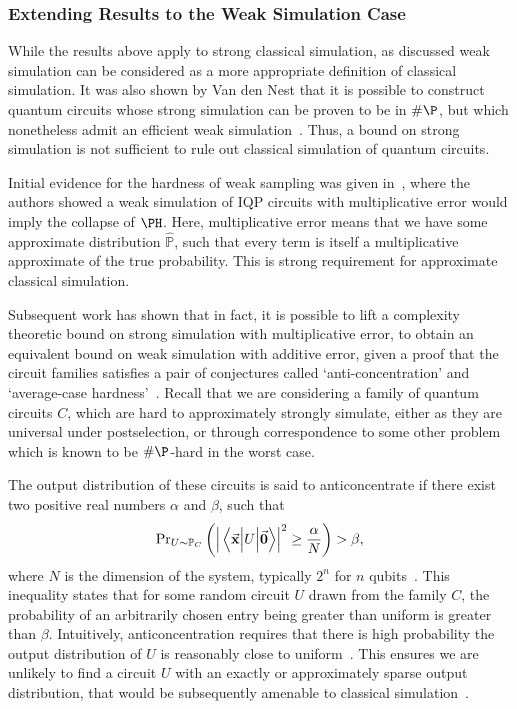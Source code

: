 \subsubsection*{Extending Results to the Weak Simulation Case}
While the results above apply to strong classical simulation, as discussed weak simulation can be considered as a more appropriate definition of classical simulation. It was also shown by Van den Nest that it is possible to construct quantum circuits whose strong simulation can be proven to be in $\#\P$, but which nonetheless admit an efficient weak simulation~\cite{VandenNest2008}. Thus, a bound on strong simulation is not sufficient to rule out classical simulation of quantum circuits.\par
Initial evidence for the hardness of weak sampling was given in~\cite{Bremner2011}, where the authors showed a weak simulation of IQP circuits with multiplicative error would imply the collapse of $\PH$. Here, multiplicative error means that we have some approximate distribution $\hat{\mathbb{P}}$, such that every term is itself a multiplicative approximate of the true probability. This is strong requirement for approximate classical simulation.\par
Subsequent work has shown that in fact, it is possible to lift a complexity theoretic bound on strong simulation with multiplicative error, to obtain an equivalent bound on weak simulation with additive error, given a proof that the circuit families satisfies a pair of conjectures called `anti-concentration' and `average-case hardness'~\cite{Hangleiter2017}. Recall that we are considering a family of quantum circuits $C$, which are hard to approximately strongly simulate, either as they are universal under postselection, or through correspondence to some other problem which is known to be $\#\P$-hard in the worst case.\par
The output distribution of these circuits is said to anticoncentrate if there exist two positive real numbers $\alpha$ and $\beta$, such that
\begin{equation}
\text{Pr}_{U\sim \mathbb{P}_{C}}\left(\left|\matrixel{\va{x}}{U}{\va{0}}\right|^{2}\geq \frac{\alpha}{N}\right) > \beta,
\label{eq:anticoncentration}
\end{equation}
where $N$ is the dimension of the system, typically $2^{n}$ for $n$ qubits~\cite{Hangleiter2017}. This inequality states that for some random circuit $U$ drawn from the family $C$, the probability of an arbitrarily chosen entry being greater than uniform is greater than $\beta$. Intuitively, anticoncentration requires that there is high probability the output distribution of $U$ is reasonably close to uniform~\cite{Harrow2017}. This ensures we are unlikely to find a circuit $U$ with an exactly or approximately sparse output distribution, that would be subsequently amenable to classical simulation~\cite{VandenNest2008,Schwarz2013}.\par

